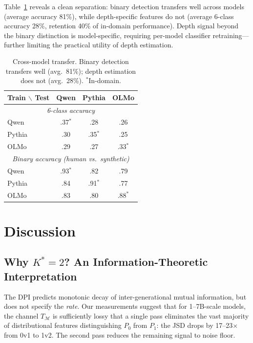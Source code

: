 \documentclass[11pt,a4paper]{article}
\begin{document}
Table~\ref{tab:transfer} reveals a clean separation: binary detection transfers well across models (average accuracy 81\%), while depth-specific features do not (average 6-class accuracy 28\%, retention 40\% of in-domain performance).
Depth signal beyond the binary distinction is model-specific, requiring per-model classifier retraining---further limiting the practical utility of depth estimation.

\begin{table}[t]
\centering
\small
\begin{tabular}{lccc}
\toprule
\textbf{Train $\backslash$ Test} & \textbf{Qwen} & \textbf{Pythia} & \textbf{OLMo} \\
\midrule
\multicolumn{4}{c}{\emph{6-class accuracy}} \\
Qwen  & .37$^*$ & .28 & .26 \\
Pythia & .30 & .35$^*$ & .25 \\
OLMo  & .29 & .27 & .33$^*$ \\
\midrule
\multicolumn{4}{c}{\emph{Binary accuracy (human vs.\ synthetic)}} \\
Qwen  & .93$^*$ & .82 & .79 \\
Pythia & .84 & .91$^*$ & .77 \\
OLMo  & .83 & .80 & .88$^*$ \\
\bottomrule
\end{tabular}
\caption{Cross-model transfer. Binary detection transfers well (avg.\ 81\%); depth estimation does not (avg.\ 28\%). $^*$In-domain.}
\label{tab:transfer}
\end{table}

\section{Discussion}

\subsection{Why $K^*=2$? An Information-Theoretic Interpretation}

The DPI predicts monotonic decay of inter-generational mutual information, but does not specify the \emph{rate}.
Our measurements suggest that for 1--7B-scale models, the channel $T_\mathcal{M}$ is sufficiently lossy that a single pass eliminates the vast majority of distributional features distinguishing $P_0$ from $P_1$: the JSD drops by 17--23$\times$ from 0v1 to 1v2.
The second pass reduces the remaining signal to noise floor.
\end{document}

